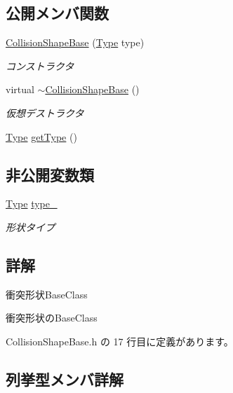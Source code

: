 \subsection*{公開メンバ関数}
\begin{DoxyCompactItemize}
\item 
\mbox{\hyperlink{class_collision_shape_base_a9dd2ab42e2a6e96c6bff832ce8ca62b9}{Collision\+Shape\+Base}} (\mbox{\hyperlink{class_collision_shape_base_a8abcef092855ad0ca191047044b002cb}{Type}} type)
\begin{DoxyCompactList}\small\item\em コンストラクタ \end{DoxyCompactList}\item 
virtual \mbox{\hyperlink{class_collision_shape_base_a64fa9e1ae6b582be42360e926ce5d6cb}{$\sim$\+Collision\+Shape\+Base}} ()
\begin{DoxyCompactList}\small\item\em 仮想デストラクタ \end{DoxyCompactList}\item 
\mbox{\hyperlink{class_collision_shape_base_a8abcef092855ad0ca191047044b002cb}{Type}} \mbox{\hyperlink{class_collision_shape_base_a662af47ebcd9f29d7c54047a0227b8bc}{get\+Type}} ()
\end{DoxyCompactItemize}
\subsection*{非公開変数類}
\begin{DoxyCompactItemize}
\item 
\mbox{\hyperlink{class_collision_shape_base_a8abcef092855ad0ca191047044b002cb}{Type}} \mbox{\hyperlink{class_collision_shape_base_a46413b1e4d4b3a35075232fa9012addb}{type\+\_\+}}
\begin{DoxyCompactList}\small\item\em 形状タイプ \end{DoxyCompactList}\end{DoxyCompactItemize}


\subsection{詳解}
衝突形状\+Base\+Class 

衝突形状の\+Base\+Class 

 Collision\+Shape\+Base.\+h の 17 行目に定義があります。



\subsection{列挙型メンバ詳解}
\mbox{\label{class_collision_shape_base_a8abcef092855ad0ca191047044b002cb}} 
